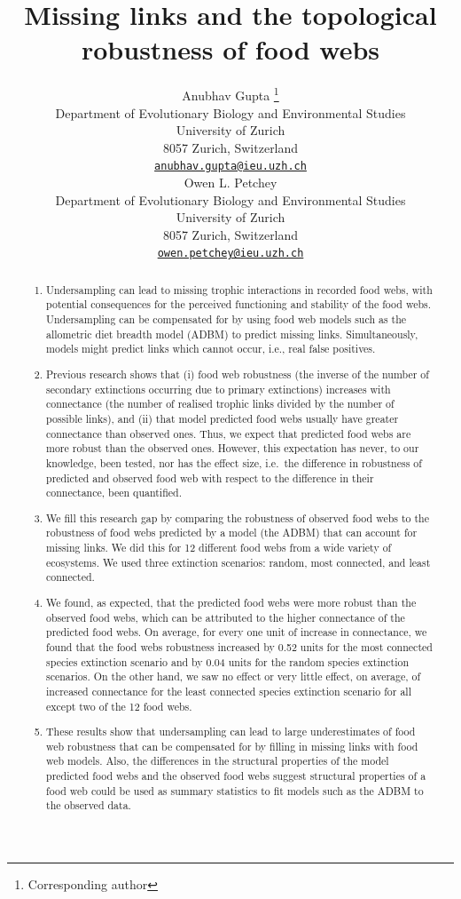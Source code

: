 \documentclass{article}
\title{Missing links and the topological robustness of food webs}
\author{
    Anubhav Gupta
    \thanks{Corresponding author}
   \\
    Department of Evolutionary Biology and Environmental Studies \\
    University of Zurich \\
  8057 Zurich, Switzerland \\
  \texttt{\href{mailto:anubhav.gupta@ieu.uzh.ch}{\nolinkurl{anubhav.gupta@ieu.uzh.ch}}} \\
   \And
    Owen L. Petchey
   \\
    Department of Evolutionary Biology and Environmental Studies \\
    University of Zurich \\
  8057 Zurich, Switzerland \\
  \texttt{\href{mailto:owen.petchey@ieu.uzh.ch}{\nolinkurl{owen.petchey@ieu.uzh.ch}}} \\
  }
\providecommand{\tightlist}{%
  \setlength{\itemsep}{0pt}\setlength{\parskip}{0pt}}
\begin{document}
\maketitle


\begin{abstract}
\begin{enumerate}
\def\labelenumi{\arabic{enumi})}
\tightlist
\item
  Undersampling can lead to missing trophic interactions in recorded
  food webs, with potential consequences for the perceived functioning
  and stability of the food webs. Undersampling can be compensated for
  by using food web models such as the allometric diet breadth model
  (ADBM) to predict missing links. Simultaneously, models might predict
  links which cannot occur, i.e., real false positives.
\item
  Previous research shows that (i) food web robustness (the inverse of
  the number of secondary extinctions occurring due to primary
  extinctions) increases with connectance (the number of realised
  trophic links divided by the number of possible links), and (ii) that
  model predicted food webs usually have greater connectance than
  observed ones. Thus, we expect that predicted food webs are more
  robust than the observed ones. However, this expectation has never, to
  our knowledge, been tested, nor has the effect size, i.e.~the
  difference in robustness of predicted and observed food web with
  respect to the difference in their connectance, been quantified.
\item
  We fill this research gap by comparing the robustness of observed food
  webs to the robustness of food webs predicted by a model (the ADBM)
  that can account for missing links. We did this for 12 different food
  webs from a wide variety of ecosystems. We used three extinction
  scenarios: random, most connected, and least connected.
\item
  We found, as expected, that the predicted food webs were more robust
  than the observed food webs, which can be attributed to the higher
  connectance of the predicted food webs. On average, for every one unit
  of increase in connectance, we found that the food webs robustness
  increased by 0.52 units for the most connected species extinction
  scenario and by 0.04 units for the random species extinction
  scenarios. On the other hand, we saw no effect or very little effect,
  on average, of increased connectance for the least connected species
  extinction scenario for all except two of the 12 food webs.
\item
  These results show that undersampling can lead to large underestimates
  of food web robustness that can be compensated for by filling in
  missing links with food web models. Also, the differences in the
  structural properties of the model predicted food webs and the
  observed food webs suggest structural properties of a food web could
  be used as summary statistics to fit models such as the ADBM to the
  observed data.
\end{enumerate}
\end{abstract}
\end{document}
